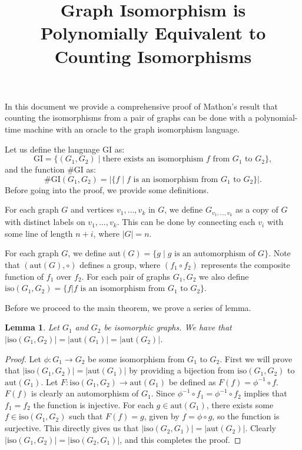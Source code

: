 \documentclass{article}
\title{Graph Isomorphism is Polynomially Equivalent to Counting Isomorphisms}
\def\shgi{\mbox{\#GI}}
\def\lgi{\mbox{GI}}
\def\aut{\mbox{aut}}
\def\iso{\mbox{iso}}
\newtheorem{lemma}[theo]{Lemma}
\begin{document}
\maketitle

In this document we provide a comprehensive proof of Mathon's result that counting the isomorphisms from a pair of graphs can be done with a polynomial-time machine with an oracle to the graph isomorphism language.\cite{DBLP:journals/ipl/Mathon79}

Let us define the language $\lgi$ as:
\[
\lgi = \{(G_1,G_2)\mid \mbox{there exists an isomorphism $f$ from $G_1$ to $G_2$} \},
\]
and the function $\shgi$ as:
\[
\shgi(G_1,G_2) = \vert \{ f \mid \mbox{$f$ is an isomorphism from $G_1$ to $G_2$}  \} \vert.
\]
Before going into the proof, we provide some definitions.

For each graph $G$ and vertices $v_1,\ldots,v_k$ in $G$, we define $G_{v_1,\ldots,v_k}$ as a copy of $G$ with distinct labels on $v_1,\ldots,v_k$. This can be done by connecting each $v_i$ with some line of length $n+i$, where $\vert G \vert = n$.

For each graph $G$, we define $\aut(G) = \{g\mid \mbox{$g$ is an automorphism of $G$} \}$. Note that $(\aut(G),\circ)$ defines a group, where $(f_1\circ f_2)$ represents the composite function of $f_1$ over $f_2$. For each pair of graphs $G_1,G_2$ we also define $\iso(G_1,G_2) = \{f\vert \mbox{$f$ is an isomorphism from $G_1$ to $G_2$}\}$.

Before we proceed to the main theorem, we prove a series of lemma.

\begin{lemma}\label{aut}
	Let $G_1$ and $G_2$ be isomorphic graphs. We have that $\vert \iso(G_1,G_2) \vert = \vert \aut(G_1) \vert = \vert \aut(G_2) \vert$.
\end{lemma}
\begin{proof}
	Let $\phi:G_1\to G_2$ be some isomorphism from $G_1$ to $G_2$. First we will prove that $\vert \iso(G_1,G_2) \vert  = \vert \aut(G_1) \vert$ by providing a bijection from $\iso(G_1,G_2)$ to $\aut(G_1)$. Let $F:\iso(G_1,G_2)\to\aut(G_1)$ be defined as $F(f) = \phi^{-1}\circ f$. $F(f)$ is clearly an automorphism of $G_1$. Since $\phi^{-1}\circ f_1 = \phi^{-1}\circ f_2$ implies that $f_1 = f_2$ the function is injective. For each $g\in\aut(G_1)$, there exists some $f\in\iso(G_1,G_2)$ such that $F(f) = g$, given by $f = \phi \circ g$, so the function is surjective. This directly gives us that $\vert \iso(G_2,G_1) \vert  = \vert \aut(G_2) \vert$. Clearly $\vert\iso(G_1,G_2)\vert = \vert\iso(G_2,G_1)\vert$, and this completes the proof.
\end{proof}
\end{document}

